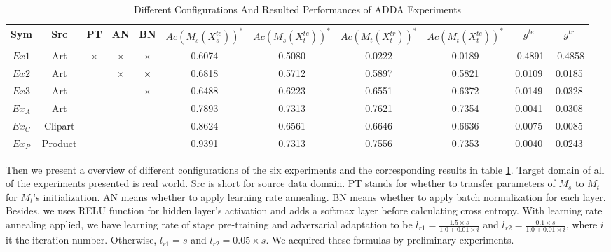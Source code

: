\documentclass[conference]{IEEEtran}
\begin{document}
 \begin{table}[h]
	\centering
	\caption{Different Configurations And Resulted Performances of ADDA Experiments}
	\label{tab:ConfigADDA}
	\begin{tabular}{ccccccccccc}
		\hline
		Sym & Src & PT & AN & BN & $Ac(M_s(X^{te}_s))^*$ & $Ac(M_s(X^{te}_t))^*$ & $Ac(M_t(X^{tr}_t))^*$ & $Ac(M_t(X^{te}_t))^*$ & $g^{te}$ & $g^{tr}$\\
		\hline
		\hline
        $Ex1$ & Art & $\times$ & $\times$ & $\times$ & 0.6074 & 0.5080 & 0.0222 & 0.0189  & -0.4891 & -0.4858\\
		$Ex2$ &  Art & \checkmark & $\times$ & $\times$ & 0.6818 & 0.5712 & 0.5897 & 0.5821 & 0.0109 & 0.0185\\
		$Ex3$ &  Art & \checkmark & \checkmark & $\times$ & 0.6488 & 0.6223 & 0.6551 & 0.6372 & 0.0149& 0.0328\\
		$Ex_A$ &  Art & \checkmark & \checkmark & \checkmark & 0.7893 & 0.7313 & 0.7621 & 0.7354 & 0.0041& 0.0308\\
		$Ex_C$ &  Clipart & \checkmark & \checkmark & \checkmark & 0.8624 & 0.6561 & 0.6646 & 0.6636 & 0.0075& 0.0085\\
		$Ex_P$ &  Product & \checkmark & \checkmark & \checkmark & 0.9391 & 0.7313 & 0.7556 & 0.7353 & 0.0040& 0.0243\\
		\hline
	\end{tabular}
\end{table}
Then we present a overview of different configurations of the six experiments and the corresponding results in table \ref{tab:ConfigADDA}. Target domain of all of the experiments presented is real world. Src is short for source data domain. PT stands for whether to transfer parameters of $M_s$ to $M_t$ for $M_t$'s initialization. AN means whether to apply learning rate annealing. BN means whether to apply batch normalization for each layer. Besides, we uses RELU function for hidden layer's activation and adds a softmax layer before calculating cross entropy. With learning rate annealing applied, we have learning rate of stage pre-training and adversarial adaptation to be $l_{r1}=\frac{1.5 \times s}{1.0 + 0.01 \times i}$ and $l_{r2}=\frac{0.1 \times s}{1.0 + 0.01 \times i}$, where $i$ it the iteration number. Otherwise, $l_{r1}=s$ and $l_{r2}=0.05 \times s$. We acquired these formulas by preliminary experiments.
\end{document}
